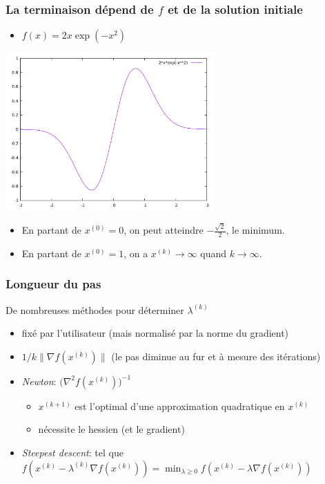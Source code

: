 \documentclass{beamer}
\begin{document}
\begin{frame}
  \frametitle{La terminaison dépend de $f$ et de la solution initiale}

  \begin{itemize}
    \item $f(x) = 2x\exp{(-x^2)}$
  \end{itemize}
  
  \begin{center}
      \includegraphics[width=0.6\textwidth]{desc-grad-non-conv}    
  \end{center}
  
  \begin{itemize}
  \item En partant de $x^{(0)} = 0$, on peut atteindre $-\frac{\sqrt{2}}{2}$, le minimum.
  \item En partant de $x^{(0)} = 1$, on a $x^{(k)} \rightarrow \infty$ quand $k \rightarrow \infty$. 
  \end{itemize}
  
\end{frame}


\begin{frame}
  \frametitle{Longueur du pas}

  \begin{block}{De nombreuses méthodes pour déterminer $\lambda^{(k)}$}
  \begin{itemize}
  \item fixé par l'utilisateur (mais normalisé par la norme du gradient)
  \item $1 / k \|{\nabla f}(x^{(k)})\|$ (le pas diminue au fur et à mesure des itérations)
  \item \emph{Newton}: $\Big( {\nabla^2 f}(x^{(k)}) \Big)^{-1}$
    \begin{itemize}
    \item $x^{(k+1)}$ est l'optimal d'une approximation quadratique en $x^{(k)}$
    \item nécessite le hessien (et le gradient)
    \end{itemize}
  \item \emph{Steepest descent}: tel que $f(x^{(k)} - \lambda^{(k)} {\nabla f}(x^{(k)}))
    = \min_{\lambda \geq 0} f(x^{(k)} - \lambda {\nabla f}(x^{(k)}))$
  \end{itemize}
  \end{block}
\end{frame}
\end{document}
